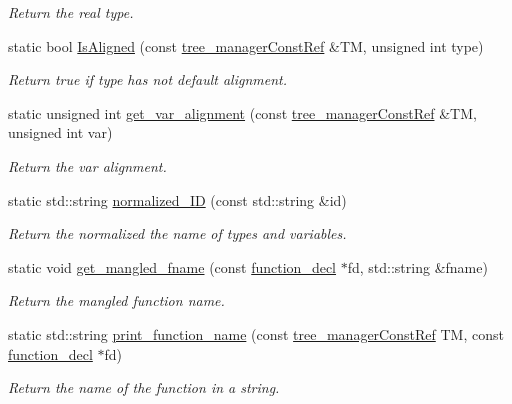\begin{DoxyCompactItemize}
\begin{DoxyCompactList}\small\item\em Return the real type. \end{DoxyCompactList}\item 
static bool \hyperlink{classtree__helper_a4d36920cdb412e76abae84bf9700629f}{Is\+Aligned} (const \hyperlink{tree__manager_8hpp_a792e3f1f892d7d997a8d8a4a12e39346}{tree\+\_\+manager\+Const\+Ref} \&TM, unsigned int type)
\begin{DoxyCompactList}\small\item\em Return true if type has not default alignment. \end{DoxyCompactList}\item 
static unsigned int \hyperlink{classtree__helper_a112bb01a10176c6cb052bde46ea1c369}{get\+\_\+var\+\_\+alignment} (const \hyperlink{tree__manager_8hpp_a792e3f1f892d7d997a8d8a4a12e39346}{tree\+\_\+manager\+Const\+Ref} \&TM, unsigned int var)
\begin{DoxyCompactList}\small\item\em Return the var alignment. \end{DoxyCompactList}\item 
static std\+::string \hyperlink{classtree__helper_a6164be0a320aaf2cbc0e5f328dbdf884}{normalized\+\_\+\+ID} (const std\+::string \&id)
\begin{DoxyCompactList}\small\item\em Return the normalized the name of types and variables. \end{DoxyCompactList}\item 
static void \hyperlink{classtree__helper_a39ce89663878170eee6f6c9bed7efc65}{get\+\_\+mangled\+\_\+fname} (const \hyperlink{structfunction__decl}{function\+\_\+decl} $\ast$fd, std\+::string \&fname)
\begin{DoxyCompactList}\small\item\em Return the mangled function name. \end{DoxyCompactList}\item 
static std\+::string \hyperlink{classtree__helper_a81bf6caaec59373f9e1a5690de590b40}{print\+\_\+function\+\_\+name} (const \hyperlink{tree__manager_8hpp_a792e3f1f892d7d997a8d8a4a12e39346}{tree\+\_\+manager\+Const\+Ref} TM, const \hyperlink{structfunction__decl}{function\+\_\+decl} $\ast$fd)
\begin{DoxyCompactList}\small\item\em Return the name of the function in a string. \end{DoxyCompactList}\item 

\end{DoxyCompactItemize}
